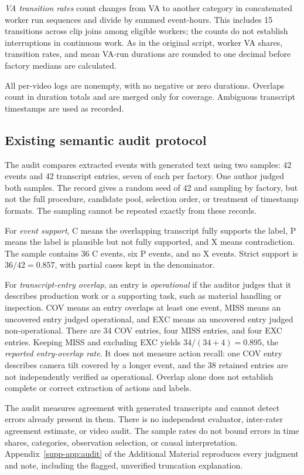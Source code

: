 \emph{VA transition rates} count changes from VA to another category in concatenated worker run sequences and divide by summed event-hours. This includes 15 transitions across clip joins among eligible workers; the counts do not establish interruptions in continuous work. As in the original script, worker VA shares, transition rates, and mean VA-run durations are rounded to one decimal before factory medians are calculated.

All per-video logs are nonempty, with no negative or zero durations. Overlaps count in duration totals and are merged only for coverage. Ambiguous transcript timestamps are used as recorded.

\subsection{Existing semantic audit protocol}
\label{sec:audit}
The audit compares extracted events with generated text using two samples: 42 events and 42 transcript entries, seven of each per factory. One author judged both samples. The record gives a random seed of 42 and sampling by factory, but not the full procedure, candidate pool, selection order, or treatment of timestamp formats. The sampling cannot be repeated exactly from these records.

For \emph{event support}, C means the overlapping transcript fully supports the label, P means the label is plausible but not fully supported, and X means contradiction. The sample contains 36 C events, six P events, and no X events. Strict support is $36/42=0.857$, with partial cases kept in the denominator.

For \emph{transcript-entry overlap}, an entry is \emph{operational} if the auditor judges that it describes production work or a supporting task, such as material handling or inspection. COV means an entry overlaps at least one event, MISS means an uncovered entry judged operational, and EXC means an uncovered entry judged non-operational. There are 34 COV entries, four MISS entries, and four EXC entries. Keeping MISS and excluding EXC yields $34/(34+4)=0.895$, the \emph{reported entry-overlap rate}. It does not measure action recall: one COV entry describes camera tilt covered by a longer event, and the 38 retained entries are not independently verified as operational. Overlap alone does not establish complete or correct extraction of actions and labels.

The audit measures agreement with generated transcripts and cannot detect errors already present in them. There is no independent evaluator, inter-rater agreement estimate, or video audit. The sample rates do not bound errors in time shares, categories, observation selection, or causal interpretation. Appendix~\ref{supp-app:audit} of the Additional Material reproduces every judgment and note, including the flagged, unverified truncation explanation.
